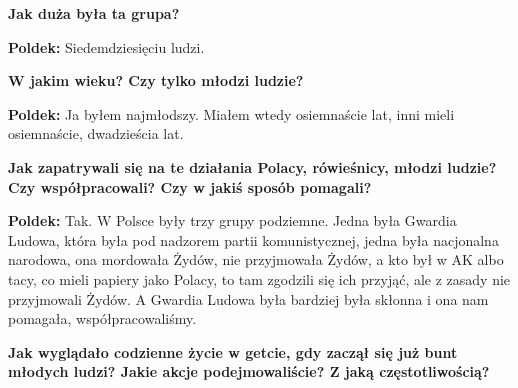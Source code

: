 \begin{otherlanguage}{polish}
\textbf{Jak duża była ta grupa?}

\textbf{Poldek:} Siedemdziesięciu ludzi.

\textbf{W jakim wieku? Czy tylko młodzi ludzie?}
 
\textbf{Poldek:} Ja byłem najmłodszy. Miałem wtedy osiemnaście lat, inni mieli osiemnaście, dwadzieścia lat.

\textbf{Jak zapatrywali się na te działania Polacy, rówieśnicy, młodzi ludzie? Czy współpracowali? Czy w jakiś sposób pomagali?}

\textbf{Poldek:}  Tak. W Polsce były trzy grupy podziemne. Jedna była Gwardia Ludowa, która była pod nadzorem partii komunistycznej, jedna była nacjonalna narodowa, ona mordowała Żydów, nie przyjmowała Żydów, a kto był w AK albo tacy, co mieli papiery jako Polacy, to tam zgodzili się ich przyjąć, ale z zasady nie przyjmowali Żydów. A Gwardia Ludowa była bardziej była skłonna i ona nam pomagała, współpracowaliśmy.
 
\textbf{Jak wyglądało codzienne życie w getcie, gdy zaczął się już bunt młodych ludzi? Jakie akcje podejmowaliście? Z jaką częstotliwością?}
   

\end{otherlanguage}
